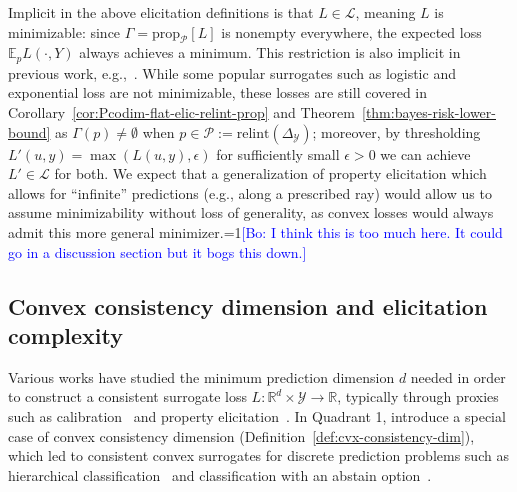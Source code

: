 \documentclass[11pt]{article} %
\newcommand{\Comments}{1}
\newcommand{\mynote}[2]{\ifnum\Comments=1\textcolor{#1}{#2}\fi}
\newcommand{\mytodo}[2]{\ifnum\Comments=1%
	\todo[linecolor=#1!80!black,backgroundcolor=#1,bordercolor=#1!80!black]{#2}\fi}
\newcommand{\jessiet}[1]{\mytodo{purple!20!white}{JF: #1}}
\newcommand{\bo}[1]{\mynote{blue}{[Bo: #1]}}
\newcommand{\btw}[1]{}%
\newcommand{\reals}{\mathbb{R}}
\newcommand{\simplex}{\Delta_\Y}
\newcommand{\relint}[1]{\mathrm{relint}(#1)}
\newcommand{\prop}[2][\mathcal{P}]{\mathrm{prop}_{#1}[#2]}
\newcommand{\E}{\mathbb{E}}
\renewcommand{\L}{\mathcal{L}}
\renewcommand{\P}{\mathcal{P}}
\newcommand{\Y}{\mathcal{Y}}
\newcommand{\exploss}[3]{\E_{#3} #1(#2,Y)}
\begin{document}
Implicit in the above elicitation definitions is that $L\in\L$, meaning $L$ is minimizable: since $\Gamma = \prop[\P]{L}$ is nonempty everywhere, the expected loss $\exploss{L}{\cdot}{p}$ always achieves a minimum.
This restriction is also implicit in previous work, e.g.,~\citep{agarwal2015consistent}.
While some popular surrogates such as logistic and exponential loss are not minimizable, these losses are still covered in Corollary~\ref{cor:Pcodim-flat-elic-relint-prop} and Theorem~\ref{thm:bayes-risk-lower-bound} as $\Gamma(p) \neq \emptyset$ when $p\in\P := \relint\simplex$; moreover, by thresholding $L'(u,y) = \max(L(u,y),\epsilon)$ for sufficiently small $\epsilon>0$ we can achieve $L'\in\L$ for both.
We expect that a generalization of property elicitation which allows for ``infinite'' predictions (e.g., along a prescribed ray) would allow us to assume minimizability without loss of generality, as convex losses would always admit this more general minimizer.\bo{I think this is too much here. It could go in a discussion section but it bogs this down.}
\btw{Some refs / related work commented out here.  I think not as relevant as elicitation complexity.}



\subsection{Convex consistency dimension and elicitation complexity}\label{subsec:complexity}

Various works have studied the minimum prediction dimension $d$ needed in order to construct a consistent surrogate loss $L: \reals^d \times \Y \to \reals$, typically through proxies such as calibration~\citep{steinwart2008support,agarwal2015consistent,ramaswamy2016convex} and property elicitation~\citep{frongillo2015vector-valued,fissler2016higher,frongillo2020elicitation}.
In Quadrant 1, \citet{ramaswamy2016convex} introduce a special case of convex consistency dimension (Definition~\ref{def:cvx-consistency-dim}), which led to consistent convex surrogates for discrete prediction problems such as hierarchical classification~\citep{ramaswamy2015hierarchical} and classification with an abstain option~\citep{ramaswamy2018consistent}.
\end{document}
